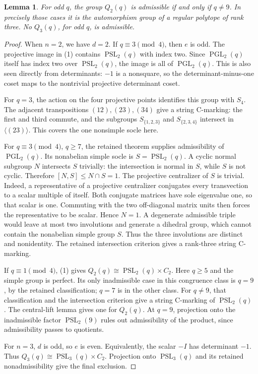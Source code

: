 \documentclass[11pt,a4paper]{article}
\newtheorem{lemma}[theorem]{Lemma}
\newcommand{\PGL}{\operatorname{PGL}}
\newcommand{\PSL}{\operatorname{PSL}}
\begin{document}
\begin{lemma}
For odd $q$, the group $Q_2(q)$ is admissible if and only if $q\ne9$.
In precisely those cases it is the automorphism group of a regular
polytope of rank three. No $Q_3(q)$, for odd $q$, is admissible.
\end{lemma}
\begin{proof}
When $n=2$, we have $d=2$. If $q\equiv3\pmod4$, then $e$ is odd.
The projective image in (1) contains $\PSL_2(q)$ with index two.
Since $\PGL_2(q)$ itself has index two over $\PSL_2(q)$, the image
is all of $\PGL_2(q)$. This is also seen directly from determinants:
$-1$ is a nonsquare, so the determinant-minus-one coset maps to the
nontrivial projective determinant coset.

For $q=3$, the action on the four projective points identifies this
group with $S_4$. The adjacent transpositions
$(12),(23),(34)$ give a string C-marking: the first and third commute,
and the subgroups $S_{\{1,2,3\}}$ and $S_{\{2,3,4\}}$ intersect
in $\langle(23)\rangle$. This covers the one nonsimple socle here.

For $q\equiv3\pmod4$, $q\ge7$, the retained theorem supplies
admissibility of $\PGL_2(q)$. Its nonabelian simple socle is
$S=\PSL_2(q)$. A cyclic normal subgroup $N$ intersects $S$ trivially:
the intersection is normal in $S$, while $S$ is not cyclic. Therefore
$[N,S]\le N\cap S=1$. The projective centralizer of $S$ is trivial.
Indeed, a representative of a projective centralizer conjugates
every transvection to a scalar multiple of itself. Both conjugate
matrices have sole eigenvalue one, so that scalar is one. Commuting
with the two off-diagonal matrix units then forces the representative
to be scalar. Hence $N=1$. A degenerate admissible triple would leave
at most two involutions and generate a dihedral group, which cannot
contain the nonabelian simple group $S$. Thus the three involutions
are distinct and nonidentity. The retained intersection criterion
gives a rank-three string C-marking.

If $q\equiv1\pmod4$, (1) gives
$Q_2(q)\cong\PSL_2(q)\times C_2$. Here $q\ge5$ and the simple
group is perfect. Its only inadmissible case in this congruence class
is $q=9$, by the retained classification; $q=7$ is in the other class.
For $q\ne9$, that classification and the intersection criterion
give a string C-marking of $\PSL_2(q)$. The central-lift lemma gives
one for $Q_2(q)$. At $q=9$, projection onto the inadmissible factor
$\PSL_2(9)$ rules out admissibility of the product, since admissibility
passes to quotients.

For $n=3$, $d$ is odd, so $e$ is even. Equivalently, the scalar $-I$
has determinant $-1$. Thus $Q_3(q)\cong\PSL_3(q)\times C_2$.
Projection onto $\PSL_3(q)$ and its retained nonadmissibility give
the final exclusion.
\end{proof}
\end{document}
